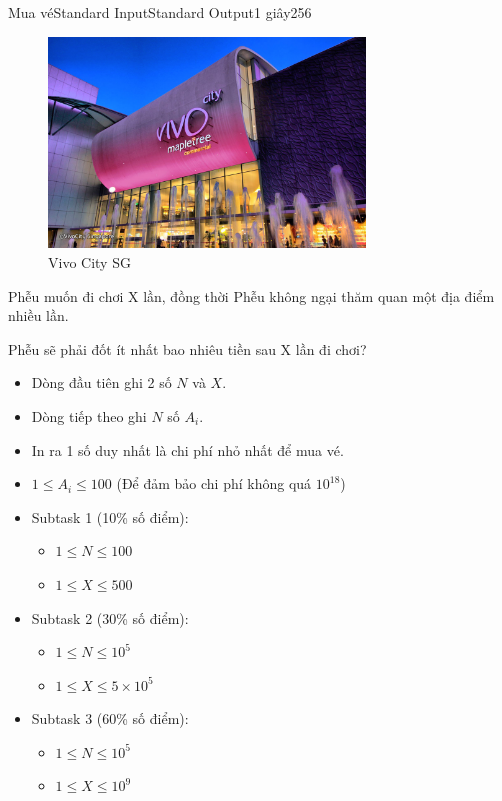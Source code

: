 \documentclass[11pt,a4paper,oneside]{article}
\begin{document}
\begin{problem}{Mua vé}{Standard Input}{Standard Output}{1 giây}{256}
\begin{figure}[h]
\centering
\includegraphics[width=0.75\textwidth]{VivoCity-Singapore}
\caption{Vivo City SG}
\end{figure}

Phễu muốn đi chơi X lần, đồng thời Phễu không ngại thăm quan một địa điểm nhiều lần.
 
Phễu sẽ phải đốt ít nhất bao nhiêu tiền sau X lần đi chơi?

\InputFile

\begin{itemize}
	\item Dòng đầu tiên ghi 2 số $N$ và $X$.
	\item Dòng tiếp theo ghi $N$ số $A_i$.
\end{itemize}

\OutputFile

\begin{itemize}
	\item In ra 1 số duy nhất là chi phí nhỏ nhất để mua vé.
\end{itemize}

\Constraints
\begin{itemize}
	\item $1 \le A_i \le 100$ (Để đảm bảo chi phí không quá $10^{18}$)
	\item Subtask 1 (10\% số điểm):
	\begin{itemize}
		\item $1 \le N \le 100$
		\item $1 \le X \le 500$
	\end{itemize}
	\item Subtask 2 (30\% số điểm):
	\begin{itemize}
		\item $1 \le N \le 10^5$
		\item $1 \le X \le 5 \times 10^5$
	\end{itemize}
	\item Subtask 3 (60\% số điểm):
	\begin{itemize}
		\item $1 \le N \le 10^5$
		\item $1 \le X \le 10^9$
	\end{itemize}
\end{itemize}


\end{problem}
\end{document}
